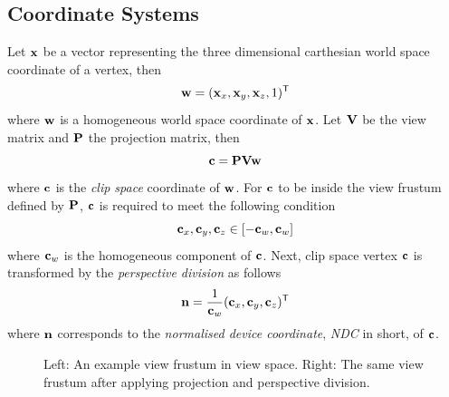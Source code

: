 \subsection{Coordinate Systems}
\label{sec:coordinate_systems}
Let $\mathbf{x}$ be a vector representing the three dimensional carthesian
world space coordinate of a vertex, then
\begin{equation}
 \mathbf{w} = (\mathbf{x}_x, \mathbf{x}_y, \mathbf{x}_z, 1)^{\mathsf{T}}
\end{equation}
where $\mathbf{w}$ is a homogeneous world space coordinate of $\mathbf{x}$.
Let $\mathbf{V}$ be the view matrix and $\mathbf{P}$ the projection matrix, then
\begin{equation}
\label{eq:ws_to_cs}
 \mathbf{c} = \mathbf{P} \mathbf{V} \mathbf{w}
\end{equation}
where $\mathbf{c}$ is the \textit{clip space} coordinate of $\mathbf{w}$. For $\mathbf{c}$ to
be inside the view frustum defined by $\mathbf{P}$, $\mathbf{c}$ is required to
meet the following condition
\begin{equation}
\label{eq:cs_bounds}
 \mvecx{c}, \mvecy{c}, \mvecz{c} \in \interval{-\mvecw{c}}{\mvecw{c}}
\end{equation}
where $\mathbf{c}_w$ is the homogeneous component of $\mathbf{c}$. Next, clip space
vertex $\mathbf{c}$ is transformed by the \textit{perspective division} as follows
\begin{equation}
\label{eq:cs_to_ndc}
 \mathbf{n} = \frac{1}{\mathbf{c}_w}(\mathbf{c}_x, \mathbf{c}_y, \mathbf{c}_z)^{\mathsf{T}}
\end{equation}
where $\mathbf{n}$ corresponds to the \textit{normalised device coordinate},
\textit{NDC} in short, of $\mathbf{c}$.
%
%
\begin{figure}
\centering
{}
\caption{Left: An example view frustum in view space. Right: The same view frustum
after applying projection and perspective division.}
\label{fig:proj_frustum_ndc}
\end{figure}
